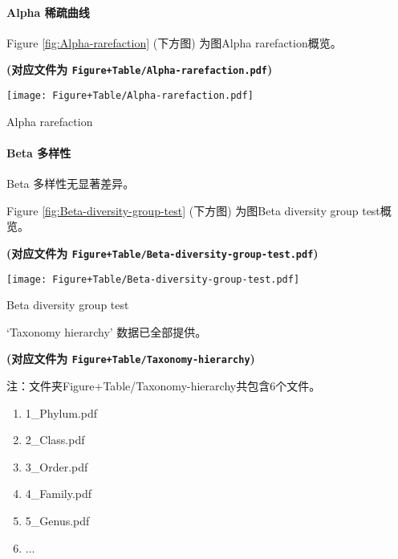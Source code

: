 \documentclass[
]{article}
\providecommand{\tightlist}{%
  \setlength{\itemsep}{0pt}\setlength{\parskip}{0pt}}
\begin{document}
\hypertarget{alpha-ux7a00ux758fux66f2ux7ebf}{%
\paragraph{Alpha 稀疏曲线}\label{alpha-ux7a00ux758fux66f2ux7ebf}}

Figure \ref{fig:Alpha-rarefaction} (下方图) 为图Alpha rarefaction概览。

\textbf{(对应文件为 \texttt{Figure+Table/Alpha-rarefaction.pdf})}

\def\@captype{figure}
\begin{center}
\texttt{[image: Figure+Table/Alpha-rarefaction.pdf]}
\caption{Alpha rarefaction}\label{fig:Alpha-rarefaction}
\end{center}

\hypertarget{beta}{%
\paragraph{Beta 多样性}\label{beta}}

Beta 多样性无显著差异。

Figure \ref{fig:Beta-diversity-group-test} (下方图) 为图Beta diversity group test概览。

\textbf{(对应文件为 \texttt{Figure+Table/Beta-diversity-group-test.pdf})}

\def\@captype{figure}
\begin{center}
\texttt{[image: Figure+Table/Beta-diversity-group-test.pdf]}
\caption{Beta diversity group test}\label{fig:Beta-diversity-group-test}
\end{center}

`Taxonomy hierarchy' 数据已全部提供。

\textbf{(对应文件为 \texttt{Figure+Table/Taxonomy-hierarchy})}

\begin{center}\begin{tcolorbox}[colback=gray!10, colframe=gray!50, width=0.9\linewidth, arc=1mm, boxrule=0.5pt]注：文件夹Figure+Table/Taxonomy-hierarchy共包含6个文件。

\begin{enumerate}\tightlist
\item 1\_Phylum.pdf
\item 2\_Class.pdf
\item 3\_Order.pdf
\item 4\_Family.pdf
\item 5\_Genus.pdf
\item ...
\end{enumerate}\end{tcolorbox}
\end{center}
\end{document}
